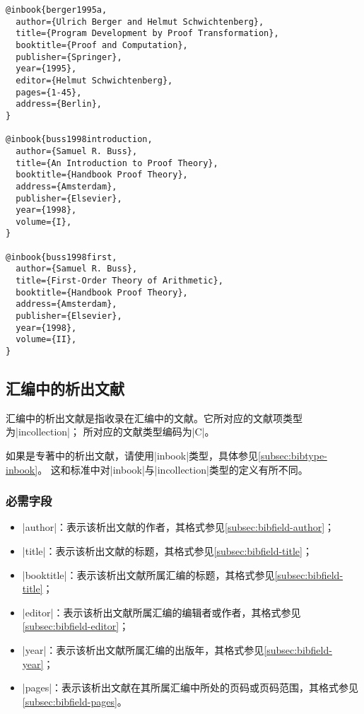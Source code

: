 \begin{verbatim}
@inbook{berger1995a,
  author={Ulrich Berger and Helmut Schwichtenberg},
  title={Program Development by Proof Transformation},
  booktitle={Proof and Computation},
  publisher={Springer},
  year={1995},
  editor={Helmut Schwichtenberg},
  pages={1-45},
  address={Berlin},
}

@inbook{buss1998introduction,
  author={Samuel R. Buss},
  title={An Introduction to Proof Theory},
  booktitle={Handbook Proof Theory},
  address={Amsterdam},
  publisher={Elsevier},
  year={1998},
  volume={I},
}

@inbook{buss1998first,
  author={Samuel R. Buss},
  title={First-Order Theory of Arithmetic},
  booktitle={Handbook Proof Theory},
  address={Amsterdam},
  publisher={Elsevier},
  year={1998},
  volume={II},
}
\end{verbatim}

\subsection{汇编中的析出文献}\label{subsec:bibtype-incollection}

汇编中的析出文献是指收录在汇编中的文献。它所对应的{\BibTeX}文献项类型为|incollection|；
所对应的文献类型编码为|C|\cite{gbt3469-1983}。

\begin{note}
如果是专著中的析出文献，请使用|inbook|类型，具体参见\ref{subsec:bibtype-inbook}。
这和标准{\BibTeX}中对|inbook|与|incollection|类型的定义有所不同。
\end{note}

\subsubsection{必需字段}

\begin{itemize}
\item |author|：表示该析出文献的作者，其格式参见\ref{subsec:bibfield-author}；
\item |title|：表示该析出文献的标题，其格式参见\ref{subsec:bibfield-title}；
\item |booktitle|：表示该析出文献所属汇编的标题，其格式参见\ref{subsec:bibfield-title}；
\item |editor|：表示该析出文献所属汇编的编辑者或作者，其格式参见\ref{subsec:bibfield-editor}；
\item |year|：表示该析出文献所属汇编的出版年，其格式参见\ref{subsec:bibfield-year}；
\item |pages|：表示该析出文献在其所属汇编中所处的页码或页码范围，其格式参见\ref{subsec:bibfield-pages}。
\end{itemize}

